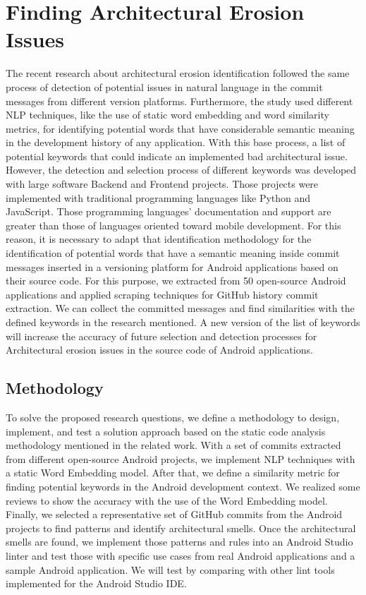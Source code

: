 \chapter{Finding Architectural Erosion Issues}
\label{cha:identification}

The recent research about architectural erosion identification followed the same process of detection of potential issues in natural language in the commit messages from different version platforms. Furthermore, the study used different NLP techniques, like the use of static word embedding and word similarity metrics, for identifying potential words that have considerable semantic meaning in the development history of any application. With this base process, a list of potential keywords that could indicate an implemented bad architectural issue. However, the detection and selection process of different keywords was developed with large software Backend and Frontend projects. Those projects were implemented with traditional programming languages like Python and JavaScript. Those programming languages' documentation and support are greater than those of languages oriented toward mobile development. For this reason, it is necessary to adapt that identification methodology for the identification of potential words that have a semantic meaning inside commit messages inserted in a versioning platform for Android applications based on their source code. For this purpose, we extracted from 50 open-source Android applications and applied scraping techniques for GitHub history commit extraction. We can collect the committed messages and find similarities with the defined keywords in the research mentioned. A new version of the list of keywords will increase the accuracy of future selection and detection processes for Architectural erosion issues in the source code of Android applications.

\section{Methodology}
To solve the proposed research questions, we define a methodology to design, implement, and test a solution approach based on the static code analysis methodology mentioned in the related work. With a set of commits extracted from different open-source Android projects, we implement NLP techniques with a static Word Embedding model. After that, we define a similarity metric for finding potential keywords in the Android development context. We realized some reviews to show the accuracy with the use of the Word Embedding model. Finally, we selected a representative set of GitHub commits from the Android projects to find patterns and identify architectural smells. Once the architectural smells are found, we implement those patterns and rules into an Android Studio linter and test those with specific use cases from real Android applications and a sample Android application. We will test by comparing with other lint tools implemented for the Android Studio IDE.

